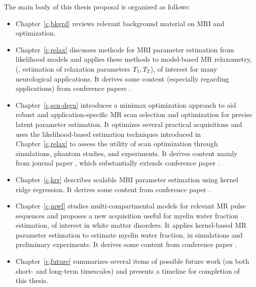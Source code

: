 The main body of this thesis proposal is organized as follows:
\begin{itemize}
\item 
	Chapter~\ref{c,bkgrd} reviews 
	relevant background material
	on MRI and optimization.
\item 
	Chapter~\ref{c,relax} discusses methods 
	for MRI parameter estimation 
	from likelihood models 
	and applies these methods 
	to model-based MR relaxometry, 
	(\ie, estimation of relaxation parameters $T_1,T_2$),
	of interest for many neurological applications.
	It derives some content 
	(especially regarding applications)
	from conference papers 
	\cite{nataraj:14:rje,nataraj:14:mbe}.
\item
	Chapter~\ref{c,scn-dsgn} introduces
	a minimax optimization approach
	to aid robust and application-specific 
	MR scan selection and optimization 
	for precise latent parameter estimation.
	It optimizes several practical acquisitions 
	and uses the likelihood-based estimation techniques 
	introduced in Chapter~\ref{c,relax}
	to assess the utility
	of scan optimization
	through simulations, 
	phantom studies, 
	and \invivo experiments.
	It derives content
	mainly from journal paper
	\cite{nataraj:17:oms},
	which substantially extends conference paper
	\cite{nataraj:15:amm}.
\item 
	Chapter~\ref{c,krr} describes 
	scalable MRI parameter estimation
	using kernel ridge regression.
	It derives some content 
	from conference paper
	\cite{nataraj:17:dfm}.
\item
	Chapter~\ref{c,mwf} studies multi-compartmental models
	for relevant MR pulse sequences
	and proposes a new acquisition 
	useful for myelin water fraction estimation,
	of interest in white matter disorders.
	It applies kernel-based MR parameter estimation
	to estimate myelin water fraction,
	in simulations and preliminary \invivo experiments.
	It derives some content from conference paper
	\cite{nataraj:17:mwf}.
\begin{comment}
\item
	Chapter~\ref{c,ss-rf} presents
	some relatively immature ideas
	on steady-state radiofrequency (RF) pulse design
	as well as associated challenges.
	This work is presently unpublished
	and may offer avenues for further research.
\end{comment}
\item 
	Chapter~\ref{c,future} summarizes several items 
	of possible future work
	(on both short- and long-term timescales) 
	and presents a timeline
	for completion of this thesis.
\end{itemize}

